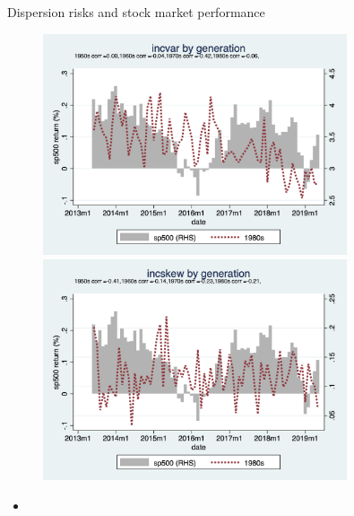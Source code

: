 \documentclass{beamer}
\begin{document}
\begin{frame}{Dispersion risks and stock market performance}
	\begin{figure}
		\centering
		\label{ts_stk_byear_g}
		\includegraphics[width=0.8\textwidth, height=\0.4\textheight]{figures/ts_incvar_byear_g_mean_stk} \\
			\includegraphics[width=0.8\textwidth, height=\0.4\textheight]{figures/ts_incskew_byear_g_mean_stk} 
	\end{figure}
	\begin{itemize}
		\item 
	\end{itemize}
\end{frame}
\end{document}
